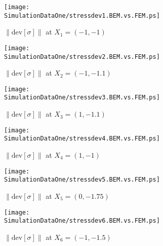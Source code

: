 \begin{figure}[h]
\begin{minipage}[c]{7.5cm}
\texttt{[image: \\SimulationDataOne/stressdev1.BEM.vs.FEM.ps]}
\caption{$\|\mbox{dev}[\sigma]\|$ at $X_1=(-1,-1)$}\label{fig:Ex2:StressDeviator:CharacteristicPoint1}
\end{minipage}
\begin{minipage}[c]{7.5cm}
\texttt{[image: \\SimulationDataOne/stressdev2.BEM.vs.FEM.ps]}
\caption{$\|\mbox{dev}[\sigma]\|$ at $X_2=(-1,-1.1)$}
\end{minipage}

\begin{minipage}[c]{7.5cm}
\texttt{[image: \\SimulationDataOne/stressdev3.BEM.vs.FEM.ps]}
\caption{$\|\mbox{dev}[\sigma]\|$ at $X_3=(1,-1.1)$}
\end{minipage}
\begin{minipage}[c]{7.5cm}
\texttt{[image: \\SimulationDataOne/stressdev4.BEM.vs.FEM.ps]}
\caption{$\|\mbox{dev}[\sigma]\|$ at $X_4=(1,-1)$}
\end{minipage}

\begin{minipage}[c]{7.5cm}
\texttt{[image: \\SimulationDataOne/stressdev5.BEM.vs.FEM.ps]}
\caption{$\|\mbox{dev}[\sigma]\|$ at $X_5=(0,-1.75)$}
\end{minipage}
\begin{minipage}[c]{7.5cm}
\texttt{[image: \\SimulationDataOne/stressdev6.BEM.vs.FEM.ps]}
\caption{$\|\mbox{dev}[\sigma]\|$ at $X_6=(-1,-1.5)$}
\end{minipage}
\end{figure}

\clearpage

